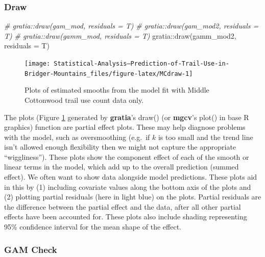 \documentclass[
]{book}
\newenvironment{Shaded}{\begin{snugshade}}{\end{snugshade}}
\newcommand{\AttributeTok}[1]{\textcolor[rgb]{0.77,0.63,0.00}{#1}}
\newcommand{\CommentTok}[1]{\textcolor[rgb]{0.56,0.35,0.01}{\textit{#1}}}
\newcommand{\FunctionTok}[1]{\textcolor[rgb]{0.00,0.00,0.00}{#1}}
\newcommand{\NormalTok}[1]{#1}
\newcommand{\SpecialCharTok}[1]{\textcolor[rgb]{0.00,0.00,0.00}{#1}}
\begin{document}
\hypertarget{draw}{%
\subsubsection{Draw}\label{draw}}

\begin{Shaded}
\begin{Highlighting}[]
\CommentTok{\# gratia::draw(gam\_mod, residuals = T)}
\CommentTok{\# gratia::draw(gam\_mod2, residuals = T)}
\CommentTok{\# gratia::draw(gamm\_mod, residuals = T)}
\NormalTok{gratia}\SpecialCharTok{::}\FunctionTok{draw}\NormalTok{(gamm\_mod2, }\AttributeTok{residuals =}\NormalTok{ T)}
\end{Highlighting}
\end{Shaded}

\begin{figure}

{\centering \texttt{[image: Statistical-Analysis--Prediction-of-Trail-Use-in-Bridger-Mountains\_files/figure-latex/MCdraw-1]} 

}

\caption{Plots of estimated smooths from the model fit with Middle Cottonwood trail use count data only.}\label{fig:MCdraw}
\end{figure}

The plots (Figure \ref{fig:MCdraw} generated by \textbf{gratia}'s draw() (or \textbf{mgcv}'s plot() in base R graphics) function are partial effect plots. These may help diagnose problems with the model, such as oversmoothing (e.g.~if \(k\) is too small and the trend line isn't allowed enough flexibility then we might not capture the appropriate ``wiggliness''). These plots show the component effect of each of the smooth or linear terms in the model, which add up to the overall prediction (summed effect). We often want to show data alongside model predictions. These plots aid in this by (1) including covariate values along the bottom axis of the plots and (2) plotting partial residuals (here in light blue) on the plots. Partial residuals are the difference between the partial effect and the data, after all other partial effects have been accounted for. These plots also include shading representing 95\% confidence interval for the mean shape of the effect.

\hypertarget{gam-check}{%
\subsubsection{GAM Check}\label{gam-check}}
\end{document}
